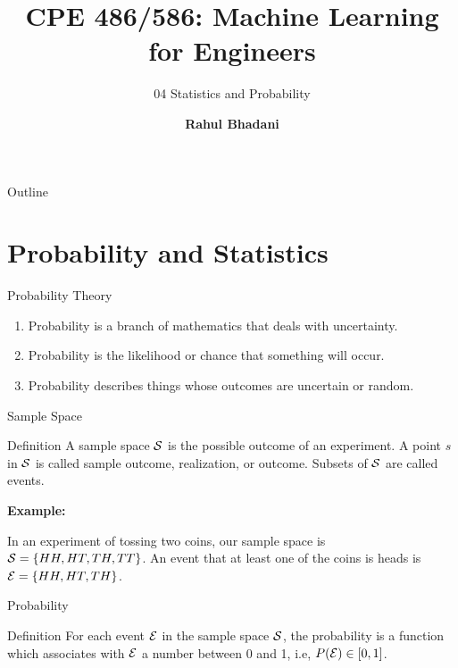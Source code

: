 \documentclass[aspectratio=169,xcolor=dvipsnames,svgnames,x11names,fleqn]{beamer}
\title[CPE 486/586: Machine Learning]{CPE 486/586: Machine Learning for Engineers} %
\subtitle{04 Statistics and Probability}
\author[Rahul Bhadani] {{\Large \textbf{Rahul Bhadani}}}
\institute[UAH] %
{
    Electrical \& Computer Engineering,  The University of Alabama in Huntsville
}
\date
\begin{document}
\begin{frame}
    \titlepage
\end{frame}

\begin{frame}{Outline}
    \backgroundtableofcontents
\end{frame}

\section{Probability and Statistics}



\begin{frame}[containsverbatim]{Probability Theory}
    \begin{enumerate}
        \item Probability is a branch of mathematics that deals with uncertainty.
        \item Probability is the likelihood or chance that something will occur. 
        \item Probability describes things whose outcomes are uncertain or random.
        
    \end{enumerate}
    \end{frame}
    
    
    \begin{frame}[containsverbatim]{Sample Space}
    \begin{tblock}{Definition}
        A sample space ${\mathcal S}$ is the possible outcome of an experiment. A point $s$ in ${\mathcal S}$ is called sample outcome, realization, or outcome. Subsets of ${\mathcal S}$ are called events. 
        
        \textbf{Example: }
    
        In an experiment of tossing two coins, our sample space is ${\mathcal S} = \{HH, HT, TH, TT\}$. An event that at least one of the coins is heads is ${\mathcal E} = \{HH, HT, TH\}$.
    \end{tblock}
    \end{frame}
    
    
    \begin{frame}[containsverbatim]{Probability}
    \begin{tblock}{Definition}
       For each event ${\mathcal E}$ in the sample space ${\mathcal S}$, the probability is a function which associates with ${\mathcal E}$ a number between 0 and 1, i.e, $P({\mathcal E}) \in [ 0, 1]$.
    \end{tblock}
    \end{frame}
    
\end{document}

